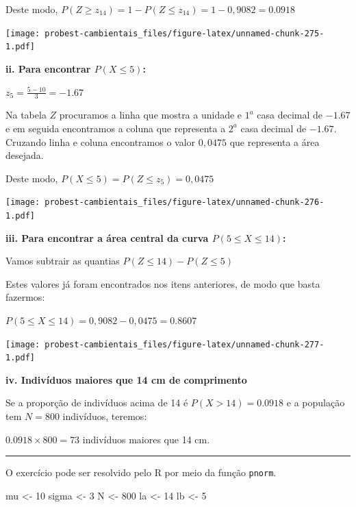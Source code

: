 \documentclass[
]{book}
\newenvironment{Shaded}{\begin{snugshade}}{\end{snugshade}}
\newcommand{\DecValTok}[1]{\textcolor[rgb]{0.00,0.00,0.81}{#1}}
\newcommand{\NormalTok}[1]{#1}
\newcommand{\OtherTok}[1]{\textcolor[rgb]{0.56,0.35,0.01}{#1}}
\begin{document}
Deste modo, \(P(Z \ge z_{14}) = 1 - P(Z \le z_{14}) = 1 - 0,9082 = 0.0918\)

\texttt{[image: probest-cambientais\_files/figure-latex/unnamed-chunk-275-1.pdf]}

\textbf{ii. Para encontrar \(P(X \le 5)\):}

\(z_{5} = \frac{5 - 10}{3} = -1.67\)

Na tabela \(Z\) procuramos a linha que mostra a unidade e \(1^a\) casa decimal de \(-1.67\) e em seguida encontramos a coluna que representa a \(2^a\) casa decimal de \(-1.67\). Cruzando linha e coluna encontramos o valor \(0,0475\) que representa a área desejada.

Deste modo, \(P(X \le 5) = P(Z \le z_{5}) = 0,0475\)

\texttt{[image: probest-cambientais\_files/figure-latex/unnamed-chunk-276-1.pdf]}

\textbf{iii. Para encontrar a área central da curva \(P(5 \le X \le 14)\):}

Vamos subtrair as quantias \(P(Z \le 14) - P(Z \le 5)\)

Estes valores já foram encontrados nos itens anteriores, de modo que basta fazermos:

\(P(5 \le X \le 14) = 0,9082 - 0,0475 = 0.8607\)

\texttt{[image: probest-cambientais\_files/figure-latex/unnamed-chunk-277-1.pdf]}

\textbf{iv. Indivíduos maiores que 14 cm de comprimento}

Se a proporção de indivíduos acima de 14 é \(P(X > 14) = 0.0918\) e a população tem \(N = 800\) indivíduos, teremos:

\(0.0918 \times 800 = 73\) indivíduos maiores que 14 cm.

\begin{center}\rule{0.5\linewidth}{0.5pt}\end{center}

O exercício pode ser resolvido pelo R por meio da função \texttt{pnorm}.

\begin{Shaded}
\begin{Highlighting}[]
\NormalTok{mu }\OtherTok{\textless{}{-}} \DecValTok{10}
\NormalTok{sigma }\OtherTok{\textless{}{-}} \DecValTok{3}
\NormalTok{N }\OtherTok{\textless{}{-}} \DecValTok{800}
\NormalTok{la }\OtherTok{\textless{}{-}} \DecValTok{14}
\NormalTok{lb }\OtherTok{\textless{}{-}} \DecValTok{5}
\end{Highlighting}
\end{Shaded}
\end{document}

